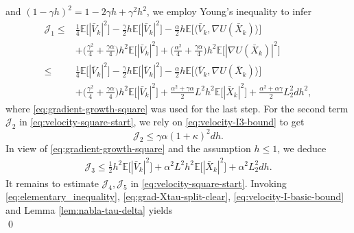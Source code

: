 \documentclass[12pt]{article}
\numberwithin{equation}{section}
\renewenvironment{proof}%
  {\begin{trivlist}%
   \item[]\ignorespaces}%
  {\qed\end{trivlist}}
\begin{document}
\begin{proof}
\begin{equation}
\end{equation}
and $(1-\gamma h)^2=1-2\gamma h+\gamma^2h^2$, we employ Young's inequality to infer
\begin{equation}
\label{eq:velocity-leading-final}
\begin{aligned}
\mathcal J_1
\leq&
\tfrac{1}{4}
\mathbb{E}
\Big[
|\bar{V}_k|^2
\Big]
-
\tfrac{\gamma}{2}h
\mathbb{E}
\Big[
|\bar{V}_k|^2
\Big]
-
\tfrac{\alpha}{2}h
\mathbb{E}
\Big[
\big\langle
\bar{V}_k,
\nabla U(\bar{X}_k)
\big\rangle
\Big]
\\
&+
\big(
\tfrac{\gamma^2}{4}
+
\tfrac{\gamma\alpha}{4}
\big)h^2
\mathbb{E}
\Big[
|\bar{V}_k|^2
\Big]
+
\big(
\tfrac{\alpha^2}{4}
+
\tfrac{\gamma\alpha}{4}
\big)h^2
\mathbb{E}
\Big[
|\nabla U(\bar{X}_k)|^2
\Big]
\\
\leq&
\tfrac{1}{4}
\mathbb{E}
\Big[
|\bar{V}_k|^2
\Big]
-
\tfrac{\gamma}{2}h
\mathbb{E}
\Big[
|\bar{V}_k|^2
\Big]
-
\tfrac{\alpha}{2}h
\mathbb{E}
\Big[
\big\langle
\bar{V}_k,
\nabla U(\bar{X}_k)
\big\rangle
\Big]
\\
&+
\big(
\tfrac{\gamma^2}{4}
+
\tfrac{\gamma\alpha}{4}
\big)h^2
\mathbb{E}
\Big[
|\bar{V}_k|^2
\Big]
+
\tfrac{\alpha^2+\gamma\alpha}{2}L^2h^2
\mathbb{E}
\Big[
|\bar{X}_k|^2
\Big]
+
\tfrac{\alpha^2+\alpha\gamma}{2}L_2^2dh^2,
\end{aligned}
\end{equation}
where \eqref{eq:gradient-growth-square} was used for the last step.
For the second term $\mathcal J_2$ in \eqref{eq:velocity-square-start}, we rely on \eqref{eq:velocity-I3-bound} to get
\begin{equation}
\label{eq:velocity-noise-final}
\mathcal J_2
\leq
\gamma\alpha(1+\kappa)^2dh.
\end{equation}
In view of \eqref{eq:gradient-growth-square} and the assumption $h\leq1$, we deduce
\begin{equation}
\label{eq:velocity-h2-leading-estimate}
\begin{aligned}
\mathcal J_3
\leq
\tfrac{1}{2}h^2
\mathbb{E}
\Big[
|\bar{V}_k|^2
\Big]
+
\alpha^2L^2h^2
\mathbb{E}
\Big[
|\bar{X}_k|^2
\Big]
+
\alpha^2L_2^2dh.
\end{aligned}
\end{equation}
It remains to estimate $\mathcal J_4, \mathcal J_5$ in \eqref{eq:velocity-square-start}. Invoking \eqref{eq:elementary_inequality}, 
\eqref{eq:grad-Xtau-split-clear}, \eqref{eq:velocity-I-basic-bound} and Lemma \ref{lem:nabla-tau-delta} yields
\begin{equation}
\label{eq:velocity-remainder-estimate}

\end{equation}
\end{proof}
\end{document}
